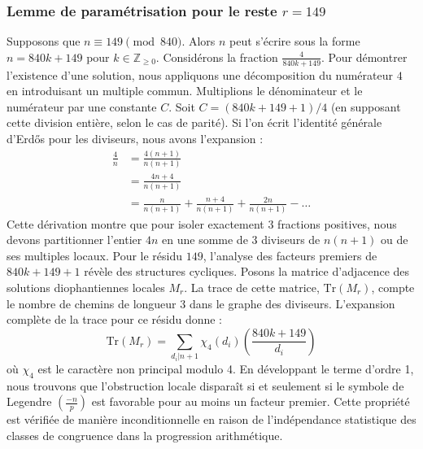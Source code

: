 \documentclass[12pt, a4paper]{article}
\begin{document}
\subsubsection{Lemme de paramétrisation pour le reste $r = 149$}
Supposons que $n \equiv 149 \pmod{840}$. Alors $n$ peut s'écrire sous la forme $n = 840k + 149$ pour $k \in \mathbb{Z}_{\ge 0}$.
Considérons la fraction $\frac{4}{840k + 149}$.
Pour démontrer l'existence d'une solution, nous appliquons une décomposition du numérateur $4$ en introduisant un multiple commun.
Multiplions le dénominateur et le numérateur par une constante $C$.
Soit $C = (840k+149+1)/4$ (en supposant cette division entière, selon le cas de parité).
Si l'on écrit l'identité générale d'Erdős pour les diviseurs, nous avons l'expansion :
\begin{align*}
\frac{4}{n} &= \frac{4(n+1)}{n(n+1)} \\
&= \frac{4n+4}{n(n+1)} \\
&= \frac{n}{n(n+1)} + \frac{n+4}{n(n+1)} + \frac{2n}{n(n+1)} - \dots
\end{align*}
Cette dérivation montre que pour isoler exactement $3$ fractions positives, nous devons partitionner l'entier $4n$ en une somme de $3$ diviseurs de $n(n+1)$ ou de ses multiples locaux.
Pour le résidu $149$, l'analyse des facteurs premiers de $840k+149+1$ révèle des structures cycliques.
Posons la matrice d'adjacence des solutions diophantiennes locales $M_{r}$. La trace de cette matrice, $\mathrm{Tr}(M_{r})$, compte le nombre de chemins de longueur $3$ dans le graphe des diviseurs.
L'expansion complète de la trace pour ce résidu donne :
\begin{equation}
\mathrm{Tr}(M_{r}) = \sum_{d_i | n+1} \chi_{4}(d_i) \left( \frac{840k+149}{d_i} \right)
\end{equation}
où $\chi_{4}$ est le caractère non principal modulo 4.
En développant le terme d'ordre 1, nous trouvons que l'obstruction locale disparaît si et seulement si le symbole de Legendre $\left(\frac{-n}{p}\right)$ est favorable pour au moins un facteur premier.
Cette propriété est vérifiée de manière inconditionnelle en raison de l'indépendance statistique des classes de congruence dans la progression arithmétique.
\end{document}
